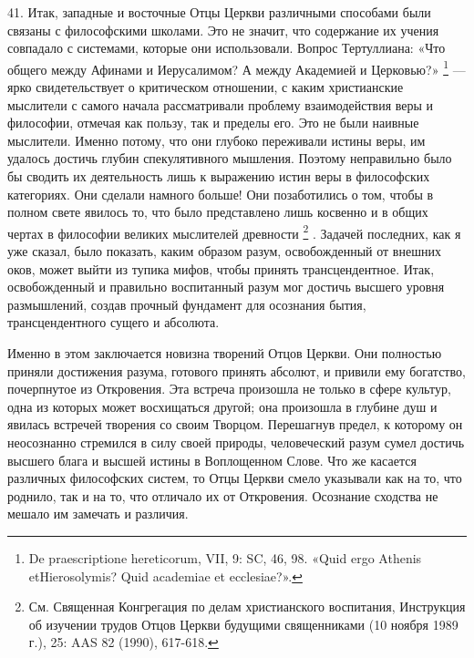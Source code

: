 \documentclass[a5paper,10pt]{article}
\begin{document}
41. Итак, западные и восточные Отцы Церкви различными способами были связаны с
философскими школами. Это не значит, что содержание их учения совпадало с
системами, которые они использовали. Вопрос Тертуллиана: «Что общего между
Афинами и Иерусалимом? А между Академией и Церковью?» \footnote{De
praescriptione hereticorum, VII, 9: SC, 46, 98. «Quid ergo Athenis
etHierosolymis? Quid academiae et ecclesiae?».}  — ярко свидетельствует о
критическом отношении, с каким христианские мыслители с самого начала
рассматривали проблему взаимодействия веры и философии, отмечая как пользу, так
и пределы его. Это не были наивные мыслители. Именно потому, что они глубоко
переживали истины веры, им удалось достичь глубин спекулятивного мышления.
Поэтому неправильно было бы сводить их деятельность лишь к выражению истин веры
в философских категориях. Они сделали намного больше! Они позаботились о том,
чтобы в полном свете явилось то, что было представлено лишь косвенно и в общих
чертах в философии великих мыслителей древности \footnote{См. Священная
Конгрегация по делам христианского воспитания, Инструкция об изучении трудов
Отцов Церкви будущими священниками (10 ноября 1989 г.), 25: AAS 82 (1990),
617-618.}  . Задачей последних, как я уже сказал, было показать, каким образом
разум, освобожденный от внешних оков, может выйти из тупика мифов, чтобы
принять трансцендентное. Итак, освобожденный и правильно воспитанный разум мог
достичь высшего уровня размышлений, создав прочный фундамент для осознания
бытия, трансцендентного сущего и абсолюта.

Именно в этом заключается новизна творений Отцов Церкви. Они полностью приняли
достижения разума, готового принять абсолют, и привили ему богатство,
почерпнутое из Откровения. Эта встреча произошла не только в сфере культур,
одна из которых может восхищаться другой; она произошла в глубине душ и явилась
встречей творения со своим Творцом. Перешагнув предел, к которому он
неосознанно стремился в силу своей природы, человеческий разум сумел достичь
высшего блага и высшей истины в Воплощенном Слове. Что же касается различных
философских систем, то Отцы Церкви смело указывали как на то, что роднило, так
и на то, что отличало их от Откровения. Осознание сходства не мешало им
замечать и различия.
\end{document}
